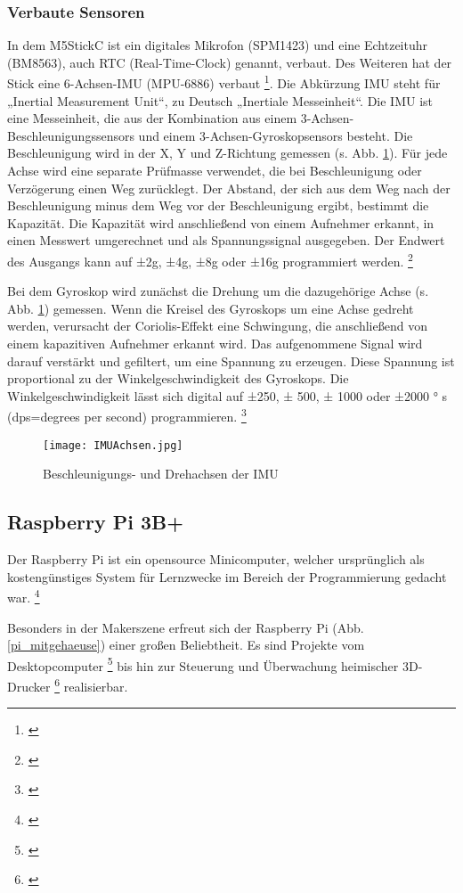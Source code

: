\subsubsection{Verbaute Sensoren}
In dem M5StickC ist ein digitales Mikrofon (SPM1423) und eine Echtzeituhr (BM8563), auch RTC
(Real-Time-Clock) genannt, verbaut. Des Weiteren hat der Stick eine 6-Achsen-IMU (MPU-6886)
verbaut \footnote{\cite{M5STACK.}}. Die Abkürzung IMU steht für „Inertial Measurement Unit“, zu Deutsch
„Inertiale Messeinheit“. Die IMU ist eine Messeinheit, die aus der Kombination aus einem 3-Achsen-Beschleunigungssensors und einem 3-Achsen-Gyroskopsensors besteht. Die Beschleunigung
wird in der X, Y und Z-Richtung gemessen (s. Abb. \ref{IMUAchsen}). Für jede Achse wird eine separate Prüfmasse
verwendet, die bei Beschleunigung oder Verzögerung einen Weg zurücklegt. Der Abstand, der sich aus
dem Weg nach der Beschleunigung minus dem Weg vor der Beschleunigung ergibt, bestimmt die
Kapazität. Die Kapazität wird anschließend von einem Aufnehmer erkannt, in einen Messwert
umgerechnet und als Spannungssignal ausgegeben. Der Endwert des Ausgangs kann auf ±2g, ±4g,
±8g oder ±16g programmiert werden. \footnote{\cite{InvenSense.}}

Bei dem Gyroskop wird zunächst die Drehung um die dazugehörige Achse (s. Abb. \ref{IMUAchsen}) gemessen.
Wenn die Kreisel des Gyroskops um eine Achse gedreht werden, verursacht der Coriolis-Effekt eine
Schwingung, die anschließend von einem kapazitiven Aufnehmer erkannt wird. Das aufgenommene
Signal wird darauf verstärkt und gefiltert, um eine Spannung zu erzeugen. Diese Spannung ist
proportional zu der Winkelgeschwindigkeit des Gyroskops. Die Winkelgeschwindigkeit lässt sich
digital auf ±250, ± 500, ± 1000 oder ±2000 °
s
(dps=degrees per second) programmieren. \footnote{\cite{InvenSense.}}

\begin{figure}[H]	%
\begin{center}
\texttt{[image: IMUAchsen.jpg]}
\caption{Beschleunigungs- und Drehachsen der IMU
\protect\cite{InvenSense.}}
\label{IMUAchsen}
\end{center}
\end{figure}

\newpage

\subsection{Raspberry Pi 3B+}
Der Raspberry Pi ist ein opensource Minicomputer, welcher ursprünglich als kostengünstiges System für Lernzwecke im Bereich der Programmierung gedacht war. \footnote{\cite{RaspberryPi.20.08.2015}} \par
Besonders in der Makerszene erfreut sich der Raspberry Pi (Abb. \ref{pi_mitgehaeuse}) einer großen Beliebtheit. Es sind Projekte vom Desktopcomputer \footnote{\cite{RaspberryPi.20.08.2015}} bis hin zur Steuerung und Überwachung heimischer 3D-Drucker \footnote{\cite{Hauge.20.04.2022}} realisierbar.\\[3mm]

